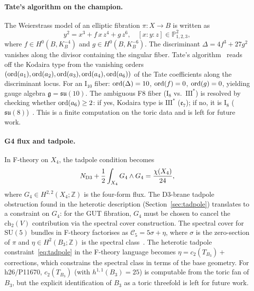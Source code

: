 \documentclass[11pt,a4paper]{article}
\newcommand{\bZ}{\mathbb{Z}}
\newcommand{\bP}{\mathbb{P}}
\newcommand{\ch}{\mathrm{ch}}
\begin{document}
\paragraph{Tate's algorithm on the champion.}
The Weierstrass model of an elliptic fibration
$\pi: X \to B$ is written as
\begin{equation}
  y^2 = x^3 + f\,x\,z^4 + g\,z^6,
  \quad [x:y:z] \in \bP^2_{1,2,3},
  \label{eq:weierstrass}
\end{equation}
where $f \in H^0(B, K_B^{-4})$ and $g \in H^0(B, K_B^{-6})$.
The discriminant $\Delta = 4f^3 + 27g^2$ vanishes along the divisor
containing the singular fiber.
Tate's algorithm~\cite{BraunHeOvrutPantev2006} reads off the Kodaira type
from the vanishing orders $({\rm ord}(a_1), {\rm ord}(a_2),
{\rm ord}(a_3), {\rm ord}(a_4), {\rm ord}(a_6))$ of the
Tate coefficients along the discriminant locus.
For an $\mathrm{I}_{10}$ fiber: ${\rm ord}(\Delta)=10$,
${\rm ord}(f) = 0$, ${\rm ord}(g) = 0$, yielding
gauge algebra $\mathfrak{g} = \mathfrak{su}(10)$.
The ambiguous F8 fiber ($\mathrm{I}_8$ vs.\ $\mathrm{III}^*$)
is resolved by checking whether ${\rm ord}(a_6) \geq 2$:
if yes, Kodaira type is $\mathrm{III}^*$ ($\mathfrak{e}_7$);
if no, it is $\mathrm{I}_8$ ($\mathfrak{su}(8)$)~\cite{BraunHeOvrutPantev2006}.
This is a finite computation on the toric data and is left for future work.

\paragraph{G4 flux and tadpole.}
In F-theory on $X_4$, the tadpole condition becomes
\begin{equation}
  N_{\rm D3} + \frac{1}{2}\int_{X_4} G_4 \wedge G_4
    = \frac{\chi(X_4)}{24},
  \label{eq:f_tadpole}
\end{equation}
where $G_4 \in H^{2,2}(X_4;\bZ)$ is the four-form flux.
The D3-brane tadpole obstruction found in the heterotic description
(Section~\ref{sec:tadpole}) translates to a constraint on $G_4$:
for the GUT fibration, $G_4$ must be chosen to cancel the
$\ch_2(V)$ contribution via the spectral cover construction.
The spectral cover for $\mathrm{SU}(5)$ bundles in F-theory
factorises as
$\mathcal{C}_5 = 5\sigma + \eta$,
where $\sigma$ is the zero-section of $\pi$ and
$\eta \in H^2(B_3;\bZ)$ is the spectral class~\cite{DonagiWijnholt2008}.
The heterotic tadpole constraint~\eqref{eq:tadpole} in the F-theory
language becomes $\eta = c_2(T_{B_3}) + $ corrections,
which constrains the spectral class in terms of the base geometry.
For h26/P11670, $c_2(T_{B_3})$ (with $h^{1,1}(B_3)=25$)
is computable from the toric fan of $B_3$, but the explicit
identification of $B_3$ as a toric threefold is left for future work.
\end{document}
